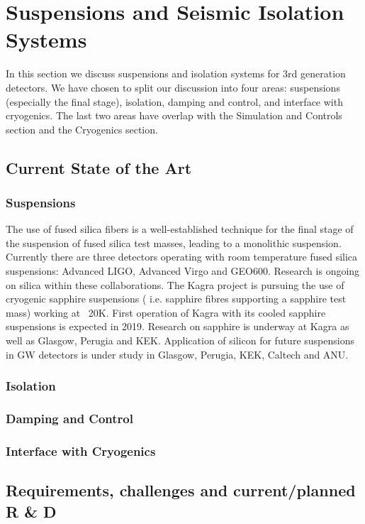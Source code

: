\section{Suspensions and Seismic Isolation Systems}
In this section we discuss suspensions and isolation systems for 3rd generation detectors. We have chosen to split our discussion into four areas: suspensions (especially the final stage), isolation, damping and control, and interface with cryogenics. The last two areas have overlap with the Simulation and Controls section and the Cryogenics section.
\subsection{Current State of the Art}
\subsubsection{Suspensions}
The use of fused silica fibers is a well-established technique for the final stage of the suspension of fused silica test masses, leading to a monolithic suspension.  Currently there are three detectors operating with room temperature fused silica suspensions: Advanced LIGO, Advanced Virgo and GEO600. Research is ongoing on silica within these collaborations.
The Kagra project is pursuing the use of cryogenic sapphire suspensions ( i.e. sapphire fibres supporting a sapphire test mass) working at ~20K. First operation of Kagra with its cooled sapphire suspensions is expected in 2019.
Research on sapphire is underway at Kagra as well as Glasgow, Perugia and KEK.
Application of silicon for future suspensions in GW detectors is under study in Glasgow, Perugia, KEK, Caltech and ANU.

\subsubsection{Isolation}
\subsubsection{Damping and Control}
\subsubsection{Interface with Cryogenics}



\subsection{Requirements, challenges and current/planned R \& D}

